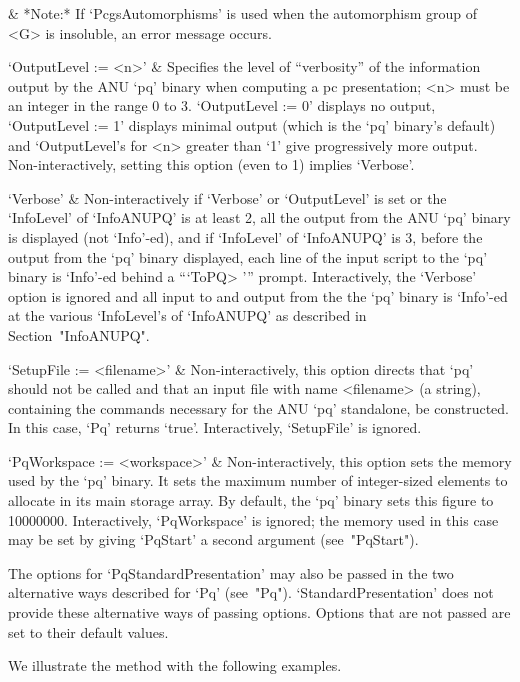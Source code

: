 &
*Note:*
If `PcgsAutomorphisms' is used when the  automorphism  group  of  <G>  is
insoluble, an error message occurs.

`OutputLevel := <n>' &
Specifies the level of ``verbosity'' of the information output by the ANU
`pq' binary when computing a pc presentation; <n> must be an  integer  in
the range 0 to 3. `OutputLevel := 0' displays no output, `OutputLevel  :=
1' displays minimal output (which  is  the  `pq'  binary's  default)  and
`OutputLevel's for <n> greater than `1' give progressively  more  output.
Non-interactively, setting this option (even to 1) implies `Verbose'.

`Verbose' &
Non-interactively if `Verbose' or `OutputLevel' is set or the `InfoLevel'
of `InfoANUPQ' is at least 2, all the output from the ANU `pq' binary  is
displayed (not `Info'-ed), and if `InfoLevel' of `InfoANUPQ' is 3, before
the output from the `pq' binary displayed, each line of the input  script
to  the  `pq'  binary  is  `Info'-ed  behind  a   ```ToPQ> '''    prompt.
Interactively, the `Verbose' option is  ignored  and  all  input  to  and
output from the the `pq' binary is `Info'-ed at the various  `InfoLevel's
of `InfoANUPQ' as described in Section~"InfoANUPQ".

`SetupFile := <filename>' &
Non-interactively, this option directs that `pq' should not be called and
that an input file  with  name  <filename>  (a  string),  containing  the
commands necessary for the ANU `pq' standalone, be constructed.  In  this
case, `Pq' returns `true'. Interactively, `SetupFile' is ignored.

`PqWorkspace := <workspace>' &
Non-interactively, this option sets the memory used by the  `pq'  binary.
It sets the maximum number of integer-sized elements to allocate  in  its
main storage array. By default, the  `pq'  binary  sets  this  figure  to
10000000. Interactively, `PqWorkspace' is ignored;  the  memory  used  in
this  case  may  be  set  by   giving   `PqStart'   a   second   argument
(see~"PqStart").

\enditems

The options for `PqStandardPresentation' may also be passed  in  the  two
alternative ways described for  `Pq'  (see~"Pq").  `StandardPresentation'
does not provide these alternative ways of passing options. Options  that
are not passed are set to their default values.

We illustrate the method with the following examples.

